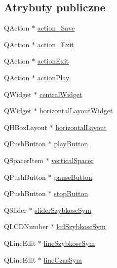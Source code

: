 \subsection*{Atrybuty publiczne}
\begin{DoxyCompactItemize}
\item 
Q\-Action $\ast$ \hyperlink{class_ui___d_main_window_a7ab98279e07bdd724a091ea06012c87b}{action\-\_\-\-Save}
\item 
Q\-Action $\ast$ \hyperlink{class_ui___d_main_window_a00e6b795743b676bdf3ed853e91f7029}{action\-\_\-\-Exit}
\item 
Q\-Action $\ast$ \hyperlink{class_ui___d_main_window_ae1fa62a4d27fa0f4a5c63c7c60cfdad2}{action\-Exit}
\item 
Q\-Action $\ast$ \hyperlink{class_ui___d_main_window_a6cfb6311ca1dd6e247d80255e2667ba7}{action\-Play}
\item 
Q\-Widget $\ast$ \hyperlink{class_ui___d_main_window_a94cf40cb4e645cfa2e80f36ffbf5018e}{central\-Widget}
\item 
Q\-Widget $\ast$ \hyperlink{class_ui___d_main_window_a777a56f3b74aa5b5cd5ff2c62a2968a9}{horizontal\-Layout\-Widget}
\item 
Q\-H\-Box\-Layout $\ast$ \hyperlink{class_ui___d_main_window_a4ab6ff85d8c5edef531b3f2111a04157}{horizontal\-Layout}
\item 
Q\-Push\-Button $\ast$ \hyperlink{class_ui___d_main_window_ad87cbf39ac14374923ed2a2b11e8b1bf}{play\-Button}
\item 
Q\-Spacer\-Item $\ast$ \hyperlink{class_ui___d_main_window_a476471e78bf431c7487fa9e0afadb76d}{vertical\-Spacer}
\item 
Q\-Push\-Button $\ast$ \hyperlink{class_ui___d_main_window_a70e142e35db4995a1fefa082406bdef3}{pause\-Button}
\item 
Q\-Push\-Button $\ast$ \hyperlink{class_ui___d_main_window_a1fe7797fff349a0f0d47d90c8438f386}{stop\-Button}
\item 
Q\-Slider $\ast$ \hyperlink{class_ui___d_main_window_a8d12f07935a52a597e57eddf50e5c98f}{slider\-Szybkosc\-Sym}
\item 
Q\-L\-C\-D\-Number $\ast$ \hyperlink{class_ui___d_main_window_a4eb8e2a87080f4f314eb96c52a82e39d}{lcd\-Szybkosc\-Sym}
\item 
Q\-Line\-Edit $\ast$ \hyperlink{class_ui___d_main_window_a73bafa5343a8e3cb7cd673a24be76008}{line\-Szybkosc\-Sym}
\item 
Q\-Line\-Edit $\ast$ \hyperlink{class_ui___d_main_window_aad165daf4686baecb2ccd6709c629579}{line\-Czas\-Sym}

\end{DoxyCompactItemize}
